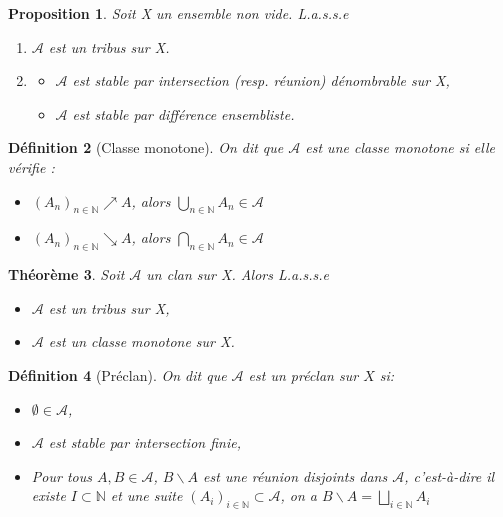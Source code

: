 \documentclass[a4paper,12pt,french]{report}
\theoremstyle{break}
\newtheorem{defin}{Définition}[section]
\newtheorem{theo}[defin]{Théorème}
\newtheorem{prop}[defin]{Proposition}
\begin{document}
\begin{prop}
        Soit X un ensemble non vide. L.a.s.s.e
        \begin{enumerate}
                \item $\mathcal{A}$ est un tribus sur X.
                \item
                        \begin{itemize}
                                \item[i)] $\mathcal{A}$ est stable par intersection (resp. réunion) dénombrable sur X,
                                \item[ii)] $\mathcal{A}$ est stable par différence ensembliste.
                        \end{itemize}
        \end{enumerate}
\end{prop}

\begin{defin}[Classe monotone]
       On dit que $\mathcal{A}$ est une classe monotone si elle vérifie : 
       \begin{itemize}
              \item $(A_{n})_{n \in \mathbb{N}} \nearrow A$, alors $\displaystyle\bigcup_{n \in \mathbb{N}} A_{n} \in \mathcal{A}$
              \item $(A_{n})_{n \in \mathbb{N}} \searrow A$, alors $\displaystyle\bigcap_{n \in \mathbb{N}} A_{n} \in \mathcal{A}$
       \end{itemize}
\end{defin}

\begin{theo}
	Soit $\mathcal{A}$ un clan sur X. Alors L.a.s.s.e
	\begin{itemize}
		\item[i)] $\mathcal{A}$ est un tribus sur X,
		\item[ii)] $\mathcal{A}$ est un classe monotone sur X.
	\end{itemize}
\end{theo}

\begin{defin}[Préclan]
        On dit que $\mathcal{A}$ est un préclan sur $X$ si:
        \begin{itemize}
              \item[i)] $\emptyset \in \mathcal{A}$,
              \item[ii)] $\mathcal{A}$ est stable par intersection finie,
              \item[iii)] Pour tous $A,B \in \mathcal{A}$, $B \backslash A$ est une réunion disjoints dans $\mathcal{A}$, c'est-à-dire il existe $I \subset \mathbb{N}$ et une suite $(A_{i})_{i \in \mathbb{N}} \subset \mathcal{A}$, on a $B \backslash A = \displaystyle \bigsqcup_{i \in \mathbb{N}} A_{i}$
        \end{itemize}
\end{defin}
\end{document}
